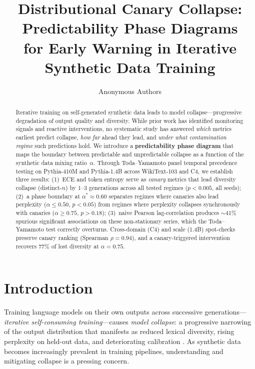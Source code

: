\documentclass[letterpaper,11pt]{article}
\title{Distributional Canary Collapse: Predictability Phase Diagrams\\for Early Warning in Iterative Synthetic Data Training}
\author{
Anonymous Authors
}
\begin{document}
\maketitle

\begin{abstract}
Iterative training on self-generated synthetic data leads to model collapse---progressive degradation of output quality and diversity.
While prior work has identified monitoring signals and reactive interventions, no systematic study has answered \emph{which} metrics earliest predict collapse, \emph{how far} ahead they lead, and \emph{under what contamination regime} such predictions hold.
We introduce a \textbf{predictability phase diagram} that maps the boundary between predictable and unpredictable collapse as a function of the synthetic data mixing ratio~$\alpha$.
Through Toda--Yamamoto panel temporal precedence testing on Pythia-410M and Pythia-1.4B across WikiText-103 and C4, we establish three results:
(1)~ECE and token entropy serve as \emph{canary} metrics that lead diversity collapse (distinct-$n$) by 1--3 generations across all tested regimes ($p<0.005$, all seeds);
(2)~a phase boundary at $\alpha^*\!\approx\!0.60$ separates regimes where canaries also lead perplexity ($\alpha \le 0.50$, $p<0.05$) from regimes where perplexity collapses synchronously with canaries ($\alpha \ge 0.75$, $p>0.18$);
(3)~naive Pearson lag-correlation produces ${\sim}41\%$ spurious significant associations on these non-stationary series, which the Toda--Yamamoto test correctly overturns.
Cross-domain (C4) and scale (1.4B) spot-checks preserve canary ranking (Spearman $\rho = 0.94$), and a canary-triggered intervention recovers 77\% of lost diversity at $\alpha = 0.75$.
\end{abstract}

\section{Introduction}

Training language models on their own outputs across successive generations---\emph{iterative self-consuming training}---causes \emph{model collapse}: a progressive narrowing of the output distribution that manifests as reduced lexical diversity, rising perplexity on held-out data, and deteriorating calibration \cite{shumailov2024ai}.
As synthetic data becomes increasingly prevalent in training pipelines, understanding and mitigating collapse is a pressing concern.
\end{document}

